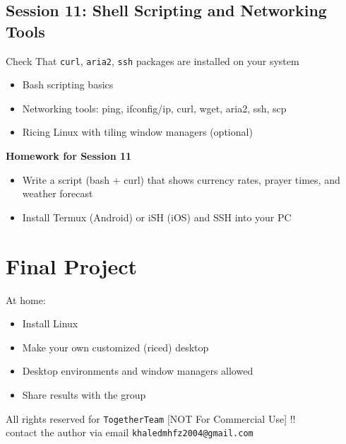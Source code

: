 \documentclass[12pt]{article}
\begin{document}
\subsection*{Session 11: Shell Scripting and Networking Tools}
\begin{warningbox}
Check That \texttt{curl}, \texttt{aria2}, \texttt{ssh} packages are installed on your system
\end{warningbox}

\begin{itemize}
    \item Bash scripting basics
    \item Networking tools: ping, ifconfig/ip, curl, wget, aria2, ssh, scp
    \item Ricing Linux with tiling window managers (optional)
\end{itemize}

\begin{highlightbox}
\textbf{Homework for Session 11}
\begin{itemize}
    \item Write a script (bash + curl) that shows currency rates, prayer times, and weather forecast
    \item Install Termux (Android) or iSH (iOS) and SSH into your PC
\end{itemize}
\end{highlightbox}

\section*{Final Project}

\begin{infobox}
At home:
\end{infobox}

\begin{itemize}
    \item Install Linux
    \item Make your own customized (riced) desktop
    \item Desktop environments and window managers allowed
    \item Share results with the group
\end{itemize}

\vspace{\fill}
\begin{center}
\color{muted}
All rights reserved for \texttt{TogetherTeam} [NOT For Commercial Use] !!\\
contact the author via email \texttt{khaledmhfz2004@gmail.com}
\end{center}
\end{document}
